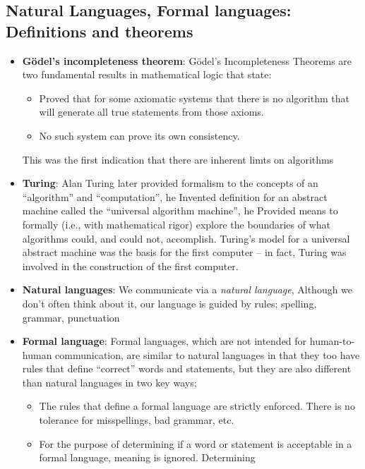 \documentclass{report}
\begin{document}
    \subsection{Natural Languages, Formal languages: Definitions and theorems}
    \begin{itemize}
        \item \textbf{G\"odel's incompleteness theorem}: 
        G\"odel's Incompleteness Theorems are two fundamental results in mathematical logic that state: 
        \begin{itemize}
            \item  Proved that for some axiomatic
                systems that there is no algorithm
                that will generate all true
                statements from those axioms.
            \item No such system can prove its own consistency.
        \end{itemize}
        This was the first indication that there are inherent limts on algorithms
        \item \textbf{Turing}: Alan Turing later provided formalism to the concepts of an “algorithm” and “computation”, he Invented definition for an abstract machine called the “universal algorithm machine”, he Provided means to formally (i.e., with mathematical rigor) explore the boundaries of what algorithms could, and could not, accomplish. Turing’s model for a universal abstract machine was the basis for the first computer – in fact, Turing was involved in the construction of the first computer.
        \item \textbf{Natural languages}: We communicate via a \textit{natural language}, Although we don’t often think about it, our language is
            guided by rules; spelling, grammar, punctuation
        \item \textbf{Formal language}:
            Formal languages, which are not intended for human-to-
            human communication, are similar to natural languages in
            that they too have rules that define “correct” words and
            statements, but they are also different than natural languages
            in two key ways;
            \begin{itemize}
                \item The rules that define a formal language are strictly enforced. There is no tolerance for misspellings, bad grammar, etc.
                \item For the purpose of determining if a word or statement is
                    acceptable in a formal language, meaning is ignored. Determining

\end{itemize}
\end{itemize}
\end{document}
